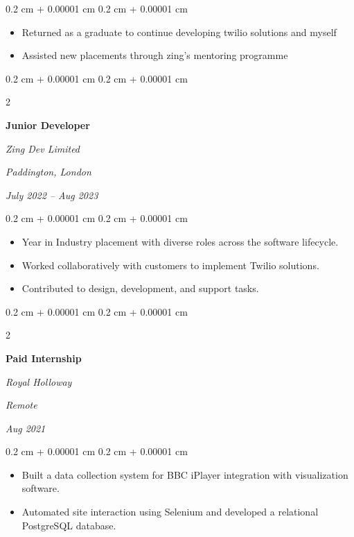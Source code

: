 \documentclass[10pt, letterpaper]{article}
\newenvironment{highlights}{
    \begin{itemize}[
        topsep=0.10 cm,
        parsep=0.10 cm,
        partopsep=0pt,
        itemsep=0pt,
        leftmargin=0.4 cm + 10pt
    ]
}{
    \end{itemize}
} %
\newenvironment{onecolentry}{
    \begin{adjustwidth}{
        0.2 cm + 0.00001 cm
    }{
        0.2 cm + 0.00001 cm
    }
}{
    \end{adjustwidth}
} %
\newenvironment{twocolentry}[2][]{
    \onecolentry
    \def\secondColumn{#2}
    \setcolumnwidth{\fill, 4.5 cm}
    \begin{paracol}{2}
}{
    \switchcolumn \raggedleft \secondColumn
    \end{paracol}
    \endonecolentry
} %
\begin{document}
        \vspace{0.10 cm}
        \begin{onecolentry}
            \begin{highlights}
                \item Returned as a graduate to continue developing twilio solutions and myself
                \item Assisted new placements through zing's mentoring programme
            \end{highlights}
        \end{onecolentry}


        \vspace{0.2 cm}

        \begin{twocolentry}{
        \textit{Paddington, London}    
            
        \textit{July 2022 – Aug 2023}}
            \textbf{Junior Developer}
            
            \textit{Zing Dev Limited}
        \end{twocolentry}

        \vspace{0.10 cm}
        \begin{onecolentry}
            \begin{highlights}
                \item Year in Industry placement with diverse roles across the software lifecycle.
                \item Worked collaboratively with customers to implement Twilio solutions.
                \item Contributed to design, development, and support tasks.
            \end{highlights}
        \end{onecolentry}


        \vspace{0.2 cm}

        \begin{twocolentry}{
        \textit{Remote}    
            
        \textit{Aug 2021}}
            \textbf{Paid Internship}
            
            \textit{Royal Holloway}
        \end{twocolentry}

        \vspace{0.10 cm}
        \begin{onecolentry}
            \begin{highlights}
                \item Built a data collection system for BBC iPlayer integration with visualization software.
                \item Automated site interaction using Selenium and developed a relational PostgreSQL database.
            \end{highlights}
        \end{onecolentry}
\end{document}
